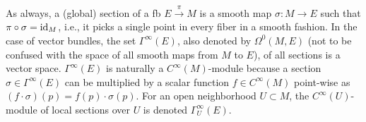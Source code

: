 \begin{defn}
    As always, a (global) section of a \gls{fb} $E\overset{\pi}{\to}M$ is a smooth map $\sigma:M\to E$ such that $\pi\circ \sigma=\operatorname{id}_M$, i.e., it picks a single point in every fiber in a smooth fashion. In the case of vector bundles, the set $\Gamma^\infty(E)$, also denoted by $\Omega^0(M,E)$ (not to be confused with the space of all smooth maps from $M$ to $E$), of all sections is a vector space. $\Gamma^\infty(E)$ is naturally a $C^\infty(M)$-module because a section $\sigma\in\Gamma^\infty(E)$ can be multiplied by a scalar function $f\in C^\infty(M)$ point-wise as $(f\cdot\sigma)(p)=f(p)\cdot\sigma(p)$. For an open neighborhood $U\subset M$, the $C^\infty(U)$-module of local sections over $U$ is denoted $\Gamma^\infty_U(E)$.
\end{defn}


